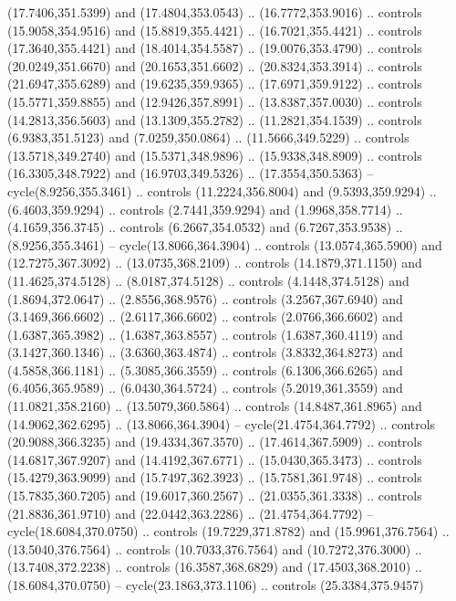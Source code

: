 \begin{scope}[cm={{1.25,0.0,0.0,-1.25,(0.0,743.43331)}}]
    (17.7406,351.5399) and (17.4804,353.0543) .. (16.7772,353.9016) .. controls
    (15.9058,354.9516) and (15.8819,355.4421) .. (16.7021,355.4421) .. controls
    (17.3640,355.4421) and (18.4014,354.5587) .. (19.0076,353.4790) .. controls
    (20.0249,351.6670) and (20.1653,351.6602) .. (20.8324,353.3914) .. controls
    (21.6947,355.6289) and (19.6235,359.9365) .. (17.6971,359.9122) .. controls
    (15.5771,359.8855) and (12.9426,357.8991) .. (13.8387,357.0030) .. controls
    (14.2813,356.5603) and (13.1309,355.2782) .. (11.2821,354.1539) .. controls
    (6.9383,351.5123) and (7.0259,350.0864) .. (11.5666,349.5229) .. controls
    (13.5718,349.2740) and (15.5371,348.9896) .. (15.9338,348.8909) .. controls
    (16.3305,348.7922) and (16.9703,349.5326) .. (17.3554,350.5363) --
    cycle(8.9256,355.3461) .. controls (11.2224,356.8004) and (9.5393,359.9294) ..
    (6.4603,359.9294) .. controls (2.7441,359.9294) and (1.9968,358.7714) ..
    (4.1659,356.3745) .. controls (6.2667,354.0532) and (6.7267,353.9538) ..
    (8.9256,355.3461) -- cycle(13.8066,364.3904) .. controls (13.0574,365.5900)
    and (12.7275,367.3092) .. (13.0735,368.2109) .. controls (14.1879,371.1150)
    and (11.4625,374.5128) .. (8.0187,374.5128) .. controls (4.1448,374.5128) and
    (1.8694,372.0647) .. (2.8556,368.9576) .. controls (3.2567,367.6940) and
    (3.1469,366.6602) .. (2.6117,366.6602) .. controls (2.0766,366.6602) and
    (1.6387,365.3982) .. (1.6387,363.8557) .. controls (1.6387,360.4119) and
    (3.1427,360.1346) .. (3.6360,363.4874) .. controls (3.8332,364.8273) and
    (4.5858,366.1181) .. (5.3085,366.3559) .. controls (6.1306,366.6265) and
    (6.4056,365.9589) .. (6.0430,364.5724) .. controls (5.2019,361.3559) and
    (11.0821,358.2160) .. (13.5079,360.5864) .. controls (14.8487,361.8965) and
    (14.9062,362.6295) .. (13.8066,364.3904) -- cycle(21.4754,364.7792) ..
    controls (20.9088,366.3235) and (19.4334,367.3570) .. (17.4614,367.5909) ..
    controls (14.6817,367.9207) and (14.4192,367.6771) .. (15.0430,365.3473) ..
    controls (15.4279,363.9099) and (15.7497,362.3923) .. (15.7581,361.9748) ..
    controls (15.7835,360.7205) and (19.6017,360.2567) .. (21.0355,361.3338) ..
    controls (21.8836,361.9710) and (22.0442,363.2286) .. (21.4754,364.7792) --
    cycle(18.6084,370.0750) .. controls (19.7229,371.8782) and (15.9961,376.7564)
    .. (13.5040,376.7564) .. controls (10.7033,376.7564) and (10.7272,376.3000) ..
    (13.7408,372.2238) .. controls (16.3587,368.6829) and (17.4503,368.2010) ..
    (18.6084,370.0750) -- cycle(23.1863,373.1106) .. controls (25.3384,375.9457)

\end{scope}
